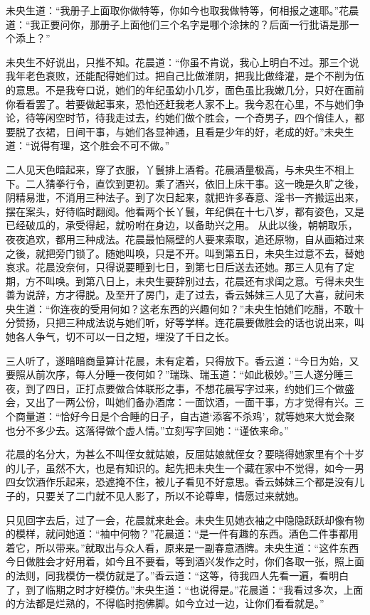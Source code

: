 \documentclass[a4paper,12pt,UTF8,twoside]{ctexbook}
\begin{document}
未央生道：“我册子上面取你做特等，你如今也取我做特等，何相报之速耶。”花晨道：“我正要问你，那册子上面他们三个名字是哪个涂抹的？后面一行批语是那一个添上？”

未央生不好说出，只推不知。花晨道：“你虽不肯说，我心上明白不过。那三个说我年老色衰败，还能配得她们过。把自己比做淮阴，把我比做绛灌，是个不削为伍的意思。不是我夸口说，她们的年纪虽幼小几岁，面色虽比我嫩几分，只好在面前你看看罢了。若要做起事来，恐怕还赶我老人家不上。我今忍在心里，不与她们争论，待等闲空时节，待我走过去，约她们做个胜会，一个奇男子，四个俏佳人，都要脱了衣裙，日间干事，与她们各显神通，且看是少年的好，老成的好。”未央生道：“说得有理，这个胜会不可不做。”

二人见天色暗起来，穿了衣服，丫鬟排上酒肴。花晨酒量极高，与未央生不相上下。二人猜拳行令，直饮到更初。乘了酒兴，依旧上床干事。这一晚是久旷之後，阴精易泄，不消用三种法子。到了次日起来，就把许多春意、淫书一齐搬运出来，摆在案头，好待临时翻阅。他看两个长丫鬟，年纪俱在十七八岁，都有姿色，又是已经破瓜的，承受得起，就吩咐在身边，以备助兴之用。 从此以後，朝朝取乐，夜夜追欢，都用三种成法。花晨最怕隔壁的人要来索取，追还原物，自从画箱过来之後，就把旁门锁了。随她叫唤，只是不开。叫到第五日，未央生过意不去，替她哀求。花晨没奈何，只得说要睡到七日，到第七日后送去还她。那三人见有了定期，方不叫唤。到第八日上，未央生要辞别过去，花晨还有求闺之意。亏得未央生善为说辞，方才得脱。及至开了房门，走了过去，香云姊妹三人见了大喜，就问未央生道：“你连夜的受用何如？这老东西的兴趣何如？”未央生怕她们吃醋，不敢十分赞扬，只把三种成法说与她们听，好等学样。连花晨要做胜会的话也说出来，叫她各人争气，切不可以一日之短，埋没了千日之长。

三人听了，遂暗暗商量算计花晨，未有定着，只得放下。香云道：“今日为始，又要照从前次序，每人分睡一夜何如？”瑞珠、瑞玉道：“如此极妙。”三人遂分睡三夜，到了四日，正打点要做合体联形之事，不想花晨写字过来，约她们三个做盛会，又出了一两公份，叫她们备办酒席：一面饮酒，一面干事，方才觉得有兴。三个商量道：“恰好今日是个合睡的日子，自古道‘添客不杀鸡’，就等她来大觉会聚也分不多少去。这落得做个虚人情。”立刻写字回她：“谨依来命。”

花晨的名分大，为甚么不叫侄女就姑娘，反屈姑娘就侄女？要晓得她家里有个十岁的儿子，虽然不大，也是有知识的。起先把未央生一个藏在家中不觉得，如今一男四女饮酒作乐起来，恐遮掩不住，被儿子看见不好意思。香云姊妹三个都是没有儿子的，只要关了二门就不见人影了，所以不论尊卑，情愿过来就她。

只见回字去后，过了一会，花晨就来赴会。未央生见她衣袖之中隐隐跃跃却像有物的模样，就问她道：“袖中何物？”花晨道：“是一件有趣的东西。酒色二件事都用着它，所以带来。”就取出与众人看，原来是一副春意酒牌。未央生道：“这件东西今日做胜会才好用着，如今且不要看，等到酒兴发作之时，你们各取一张，照上面的法则，同我模仿一模仿就是了。”香云道：“这等，待我四人先看一遍，看明白了，到了临期之时才好模仿。”未央生道：“也说得是。”花晨道：“我看过多次，上面的方法都是烂熟的，不得临时抱佛脚。如今立过一边，让你们看看就是。”
\end{document}
